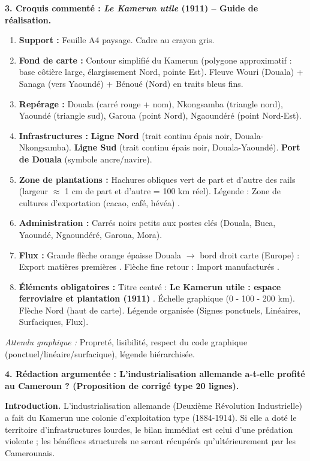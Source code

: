 \documentclass[11pt]{article}
\newcommand{\cle}[1]{{\popxbold\color{popdark}#1}}
\begin{document}
\begin{exoresolu}
\medskip
\textbf{3. Croquis commenté : \emph{Le Kamerun utile} (1911) -- Guide de réalisation.}
\begin{enumerate}
    \item \textbf{Support :} Feuille A4 paysage. Cadre au crayon gris.
    \item \textbf{Fond de carte :} Contour simplifié du Kamerun (polygone approximatif : base côtière large, élargissement Nord, pointe Est). Fleuve Wouri (Douala) + Sanaga (vers Yaoundé) + Bénoué (Nord) en traits bleus fins.
    \item \textbf{Repérage :} Douala (carré rouge + nom), Nkongsamba (triangle nord), Yaoundé (triangle sud), Garoua (point Nord), Ngaoundéré (point Nord-Est).
    \item \textbf{Infrastructures :} \textbf{Ligne Nord} (trait continu épais noir, Douala-Nkongsamba). \textbf{Ligne Sud} (trait continu épais noir, Douala-Yaoundé). \textbf{Port de Douala} (symbole ancre/navire).
    \item \textbf{Zone de plantations :} Hachures obliques \textcolor{popgreen}{vert} de part et d'autre des rails (largeur $\approx$ 1 cm de part et d'autre = 100 km réel). Légende : \og Zone de cultures d'exportation (cacao, café, hévéa) \fg.
    \item \textbf{Administration :} Carrés noirs petits aux postes clés (Douala, Buea, Yaoundé, Ngaoundéré, Garoua, Mora).
    \item \textbf{Flux :} Grande flèche \textcolor{poporange}{orange} épaisse Douala $\rightarrow$ bord droit carte (Europe) : \og Export matières premières \fg. Flèche fine retour : \og Import manufacturés \fg.
    \item \textbf{Éléments obligatoires :} Titre centré : \og \textbf{Le Kamerun utile : espace ferroviaire et plantation (1911)} \fg. Échelle graphique (0 - 100 - 200 km). Flèche Nord (haut de carte). Légende organisée (Signes ponctuels, Linéaires, Surfaciques, Flux).
\end{enumerate}
\emph{Attendu graphique :} Propreté, lisibilité, respect du code graphique (ponctuel/linéaire/surfacique), légende hiérarchisée.

\medskip
\textbf{4. Rédaction argumentée : \og L'industrialisation allemande a-t-elle profité au Cameroun ? \fg (Proposition de corrigé type 20 lignes).}

\textbf{Introduction.} L'industrialisation allemande (\cle{Deuxième Révolution Industrielle}) a fait du Kamerun une \cle{colonie d'exploitation} type (1884-1914). Si elle a doté le territoire d'infrastructures lourdes, le bilan immédiat est celui d'une prédation violente ; les bénéfices structurels ne seront récupérés qu'ultérieurement par les Camerounais.


\end{exoresolu}
\end{document}
